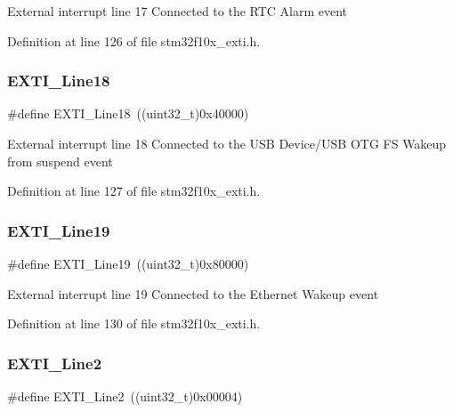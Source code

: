 External interrupt line 17 Connected to the R\+TC Alarm event 

Definition at line 126 of file stm32f10x\+\_\+exti.\+h.

\mbox{\label{group___e_x_t_i___lines_ga6cdf346a3e7a3c8dbb036aca6741207c}} 
\subsubsection{\texorpdfstring{E\+X\+T\+I\+\_\+\+Line18}{EXTI\_Line18}}
{\footnotesize\ttfamily \#define E\+X\+T\+I\+\_\+\+Line18~((uint32\+\_\+t)0x40000)}

External interrupt line 18 Connected to the U\+SB Device/\+U\+SB O\+TG FS Wakeup from suspend event 

Definition at line 127 of file stm32f10x\+\_\+exti.\+h.

\mbox{\label{group___e_x_t_i___lines_ga49ac0744621f88d432d85838483ad1de}} 
\subsubsection{\texorpdfstring{E\+X\+T\+I\+\_\+\+Line19}{EXTI\_Line19}}
{\footnotesize\ttfamily \#define E\+X\+T\+I\+\_\+\+Line19~((uint32\+\_\+t)0x80000)}

External interrupt line 19 Connected to the Ethernet Wakeup event 

Definition at line 130 of file stm32f10x\+\_\+exti.\+h.

\mbox{\label{group___e_x_t_i___lines_gaec4189bb2709c8c15a0339d1b0b9865a}} 
\subsubsection{\texorpdfstring{E\+X\+T\+I\+\_\+\+Line2}{EXTI\_Line2}}
{\footnotesize\ttfamily \#define E\+X\+T\+I\+\_\+\+Line2~((uint32\+\_\+t)0x00004)}

